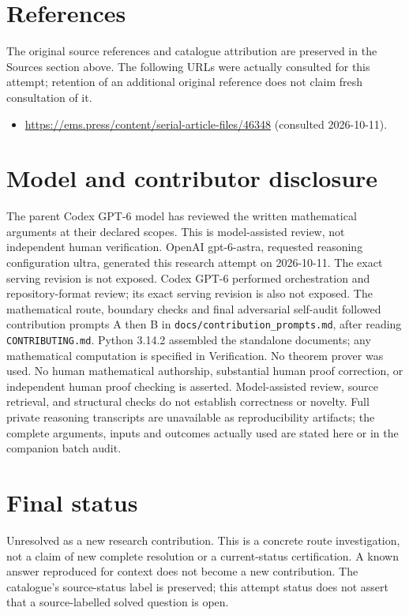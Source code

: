 \documentclass[11pt]{article}
\begin{document}
\section{References}
The original source references and catalogue attribution are preserved in the
Sources section above. The following URLs were actually consulted for this attempt;
retention of an additional original reference does not claim fresh consultation of it.
\begin{itemize}
\item \url{https://ems.press/content/serial-article-files/46348} (consulted 2026-10-11). 
\end{itemize}
\section{Model and contributor disclosure}
The parent Codex GPT-6 model has reviewed the written mathematical arguments at their declared scopes. This is model-assisted review, not independent human verification.
OpenAI gpt-6-astra, requested reasoning configuration ultra, generated this research
attempt on 2026-10-11. The exact serving revision is not exposed. Codex GPT-6
performed orchestration and repository-format review; its exact serving revision
is also not exposed. The mathematical route, boundary checks and final adversarial
self-audit followed contribution prompts A then B in
\texttt{docs/contribution\_prompts.md}, after reading \texttt{CONTRIBUTING.md}.
Python 3.14.2 assembled the standalone documents; any mathematical computation is
specified in Verification. No theorem prover was used. No human mathematical
authorship, substantial human proof correction, or independent human proof checking
is asserted. Model-assisted review, source retrieval, and structural checks do not
establish correctness or novelty. Full private reasoning transcripts are unavailable
as reproducibility artifacts; the complete arguments, inputs and outcomes actually
used are stated here or in the companion batch audit.
\section{Final status}
Unresolved as a new research contribution. This is a concrete route investigation,
not a claim of new complete resolution or a current-status certification. A known
answer reproduced for context does not become a new contribution. The catalogue's
source-status label is preserved; this attempt status does not assert that a
source-labelled solved question is open.
\end{document}
